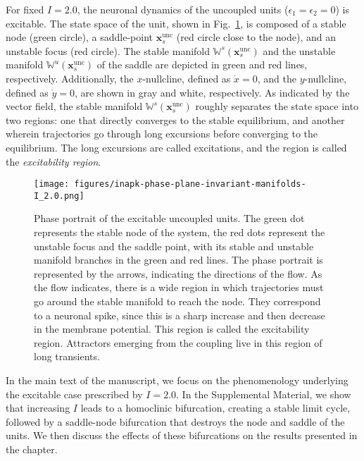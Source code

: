For fixed $I = 2.0$, the neuronal dynamics of the uncoupled units ($\epsilon_1 = \epsilon_2 = 0$) is excitable. The state space of the unit, shown in Fig.~\ref{fig:excitable-neuron}, is composed of a stable node (green circle), a saddle-point $\mathbf{x}_s^\mathrm{unc}$ (red circle close to the node), and an unstable focus (red circle). The stable manifold $\mathbb{W}^s(\mathbf{x}_s^\mathrm{unc})$ and the unstable manifold $\mathbb{W}^u(\mathbf{x}_s^\mathrm{unc})$ of the saddle are depicted in green and red lines, respectively. Additionally, the $x$-nullcline, defined as $\dot{x} = 0$, and the $y$-nullcline, defined as $\dot{y} = 0$, are shown in gray and white, respectively. 
As indicated by the vector field, the stable manifold $\mathbb{W}^s(\mathbf{x}_s^\mathrm{unc})$ roughly separates the state space into two regions: one that directly converges to the stable equilibrium, and another wherein trajectories go through long excursions before converging to the equilibrium. The long excursions are called excitations, and the region is called the \textit{excitability region}. 
%
\begin{figure}
    \centering
    \texttt{[image: figures/inapk-phase-plane-invariant-manifolds-I\_2.0.png]}
    \caption{Phase portrait of the excitable uncoupled units. The green dot represents the stable node of the system, the red dots represent the unstable focus and the saddle point, with its stable and unstable manifold branches in the green and red lines. The phase portrait is represented by the arrows, indicating the directions of the flow. As the flow indicates, there is a wide region in which trajectories must go around the stable manifold to reach the node. They correspond to a neuronal spike, since this is a sharp increase and then decrease in the membrane potential. This region is called the excitability region. Attractors emerging from the coupling live in this region of long transients. }
    \label{fig:excitable-neuron}
\end{figure}

In the main text of the manuscript, we focus on the phenomenology underlying the excitable case prescribed by $I=2.0$. In the Supplemental Material, we show that increasing $I$ leads to a homoclinic bifurcation, creating a stable limit cycle, followed by a saddle-node bifurcation that destroys the node and saddle of the units. We then discuss the effects of these bifurcations on the results presented in the chapter.

